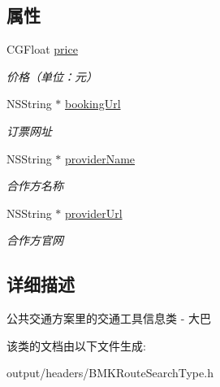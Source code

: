 \subsection*{属性}
\begin{DoxyCompactItemize}
\item 
\hypertarget{interface_b_m_k_coach_vehicle_info_aae8c6671508efbd5f9687ea4c616c80a}{}C\+G\+Float \hyperlink{interface_b_m_k_coach_vehicle_info_aae8c6671508efbd5f9687ea4c616c80a}{price}\label{interface_b_m_k_coach_vehicle_info_aae8c6671508efbd5f9687ea4c616c80a}

\begin{DoxyCompactList}\small\item\em 价格（单位：元） \end{DoxyCompactList}\item 
\hypertarget{interface_b_m_k_coach_vehicle_info_a9e6ae5b9e520e09b103437cd174173db}{}N\+S\+String $\ast$ \hyperlink{interface_b_m_k_coach_vehicle_info_a9e6ae5b9e520e09b103437cd174173db}{booking\+Url}\label{interface_b_m_k_coach_vehicle_info_a9e6ae5b9e520e09b103437cd174173db}

\begin{DoxyCompactList}\small\item\em 订票网址 \end{DoxyCompactList}\item 
\hypertarget{interface_b_m_k_coach_vehicle_info_a7981a77e5354fe66cf17170ee7848acf}{}N\+S\+String $\ast$ \hyperlink{interface_b_m_k_coach_vehicle_info_a7981a77e5354fe66cf17170ee7848acf}{provider\+Name}\label{interface_b_m_k_coach_vehicle_info_a7981a77e5354fe66cf17170ee7848acf}

\begin{DoxyCompactList}\small\item\em 合作方名称 \end{DoxyCompactList}\item 
\hypertarget{interface_b_m_k_coach_vehicle_info_aef54879d8f42eadd3904d4db79fb0e3e}{}N\+S\+String $\ast$ \hyperlink{interface_b_m_k_coach_vehicle_info_aef54879d8f42eadd3904d4db79fb0e3e}{provider\+Url}\label{interface_b_m_k_coach_vehicle_info_aef54879d8f42eadd3904d4db79fb0e3e}

\begin{DoxyCompactList}\small\item\em 合作方官网 \end{DoxyCompactList}\end{DoxyCompactItemize}


\subsection{详细描述}
公共交通方案里的交通工具信息类 -\/ 大巴 

该类的文档由以下文件生成\+:\begin{DoxyCompactItemize}
\item 
output/headers/B\+M\+K\+Route\+Search\+Type.\+h\end{DoxyCompactItemize}
